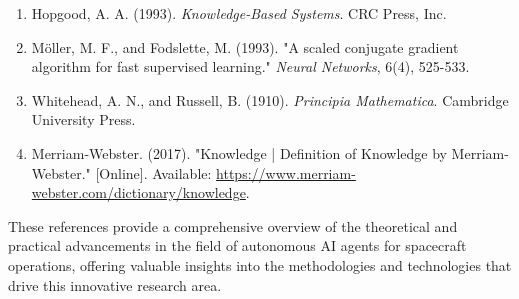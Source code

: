 \documentclass[a4paper, 11pt]{article}
\begin{document}
\begin{enumerate}
    \item Hopgood, A. A. (1993). \textit{Knowledge-Based Systems}. CRC Press, Inc.
    
    \item Möller, M. F., and Fodslette, M. (1993). "A scaled conjugate gradient algorithm for fast supervised learning." \textit{Neural Networks}, 6(4), 525-533.
    
    \item Whitehead, A. N., and Russell, B. (1910). \textit{Principia Mathematica}. Cambridge University Press.
    
    \item Merriam-Webster. (2017). "Knowledge | Definition of Knowledge by Merriam-Webster." [Online]. Available: \url{https://www.merriam-webster.com/dictionary/knowledge}.
\end{enumerate}

These references provide a comprehensive overview of the theoretical and practical advancements in the field of autonomous AI agents for spacecraft operations, offering valuable insights into the methodologies and technologies that drive this innovative research area.
\end{document}
